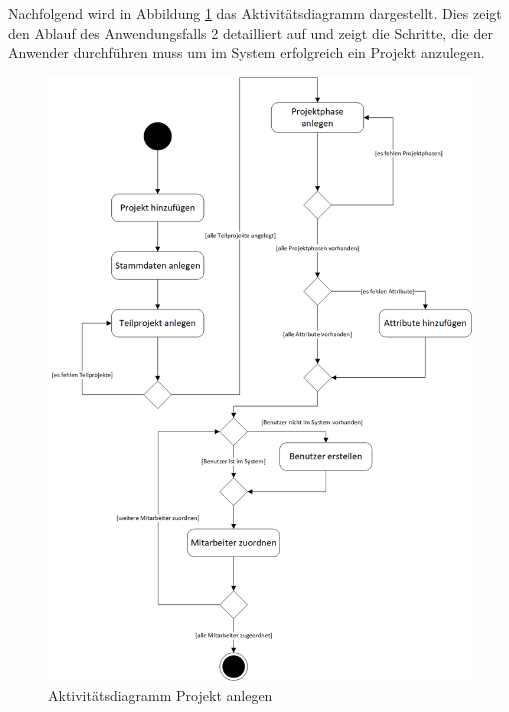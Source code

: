 Nachfolgend wird in Abbildung \ref{fig:AD2} das Aktivitätsdiagramm dargestellt. Dies zeigt den Ablauf des Anwendungsfalls 2 detailliert auf und zeigt die Schritte, die der Anwender durchführen muss um im System erfolgreich ein Projekt anzulegen.
\begin{figure}[h]
    \centering
    \includegraphics[scale=0.67]{./Bilder/AD2_ProjektAnlegen.png}
    \caption[Aktivitätsdiagramm Anwendungsfall 2]{Aktivitätsdiagramm Projekt anlegen}
    \label{fig:AD2}
\end{figure}

\newpage
